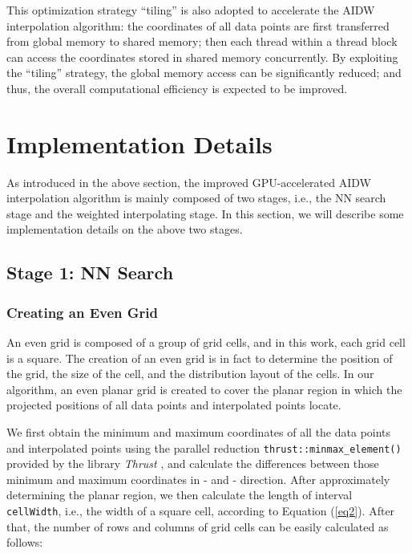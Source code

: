\documentclass[final,5p,times,twocolumn,authoryear]{elsarticle}
\begin{document}
			This optimization strategy ``tiling'' is also adopted to accelerate the AIDW 
			interpolation algorithm: the coordinates of all data points are first 
			transferred from global memory to shared memory; then each thread within a 
			thread block can access the coordinates stored in shared memory 
			concurrently. By exploiting the ``tiling'' strategy, the global memory 
			access can be significantly reduced; and thus, the overall computational 
			efficiency is expected to be improved.
			
			\section{Implementation Details}
			As introduced in the above section, the improved GPU-accelerated AIDW 
			interpolation algorithm is mainly composed of two stages, i.e., the NN 
			search stage and the weighted interpolating stage. In this section, we will 
			describe some implementation details on the above two stages. 
			
			\subsection{Stage 1: NN Search}
			\subsubsection{Creating an Even Grid}
			
			An even grid is composed of a group of grid cells, and in this work, each 
			grid cell is a square. The creation of an even grid is in fact to determine 
			the position of the grid, the size of the cell, and the distribution layout 
			of the cells. In our algorithm, an even planar grid is created to cover the 
			planar region in which the projected positions of all data points and 
			interpolated points locate. 
			
			We first obtain the minimum and maximum coordinates of all the data points 
			and interpolated points using the parallel reduction 
			\texttt{thrust::minmax{\_}element()} provided by the library \textit{Thrust} \citep{30Bell2012359}, and 
			calculate the differences between those minimum and maximum coordinates in 
			- and - direction. After approximately determining the planar region, we 
			then calculate the length of interval \texttt{cellWidth}, i.e., the width of a square 
			cell, according to Equation (\ref{eq2}). After that, the number of rows and columns 
			of grid cells can be easily calculated as follows:
			
\end{document}
